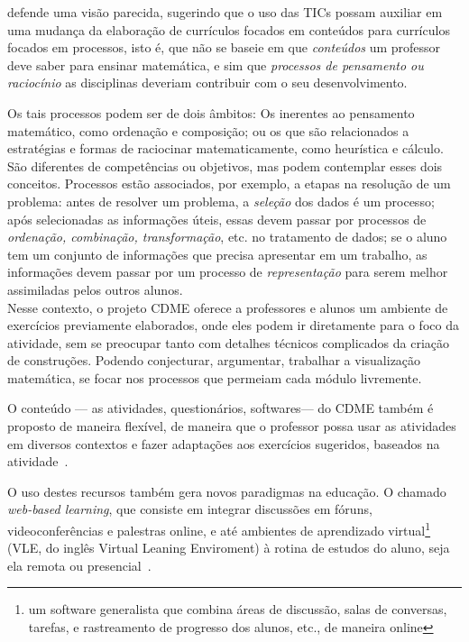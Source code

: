  defende uma visão parecida, sugerindo que o uso das TICs possam auxiliar em uma mudança da elaboração de currículos focados em conteúdos para currículos focados em processos, isto é, que não se baseie em que \textit{conteúdos} um professor deve saber para ensinar matemática, e sim que \textit{processos de pensamento ou raciocínio} as disciplinas deveriam contribuir com o seu desenvolvimento. 

Os tais processos podem ser de dois âmbitos: Os inerentes ao pensamento matemático, como ordenação e composição; ou os que são relacionados a estratégias e formas de raciocinar matematicamente, como heurística e cálculo. São diferentes de competências ou objetivos, mas podem contemplar esses dois conceitos. Processos estão associados, por exemplo, a etapas na resolução de um problema: antes de resolver um problema, a \textit{seleção} dos dados é um processo; após selecionadas as informações úteis, essas devem passar por processos de \textit{ordenação, combinação, transformação}, etc. no tratamento de dados; se o aluno tem um conjunto de informações que precisa apresentar em um trabalho, as informações devem passar por um processo de \textit{representação} para serem melhor assimiladas pelos outros alunos.
\\

Nesse contexto, o projeto CDME oferece a professores e alunos um ambiente de exercícios previamente elaborados, onde eles podem ir diretamente para o foco da atividade, sem se preocupar tanto com detalhes técnicos complicados da criação de construções. Podendo conjecturar, argumentar, trabalhar a visualização matemática, se focar nos processos que permeiam cada módulo livremente.

O conteúdo --- as atividades, questionários, softwares--- do CDME também é proposto de maneira flexível, de maneira que o professor possa usar as atividades em diversos contextos e fazer adaptações aos exercícios sugeridos, baseados na atividade~\cite{cdmebortolossi2016conteudos}.

O uso destes recursos também gera novos paradigmas na educação. O chamado \textit{web-based learning}, que consiste em integrar discussões em fóruns, videoconferências e palestras online, e até ambientes de aprendizado virtual\footnote{um software generalista que combina áreas de discussão, salas de conversas, tarefas, e rastreamento de progresso dos alunos, etc., de maneira online} (VLE, do inglês Virtual Leaning Enviroment) à rotina de estudos do aluno, seja ela remota ou presencial~\cite{mckimm2006abc}.

